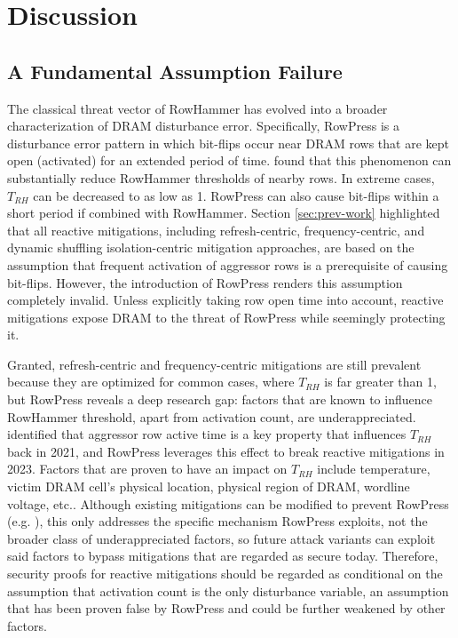 \documentclass[journal,twocolumn]{IEEEtran}
\begin{document}
\section{Discussion}\label{sec:eval}

\subsection{A Fundamental Assumption Failure}

The classical threat vector of RowHammer has evolved into a broader characterization of DRAM disturbance error. Specifically, RowPress\cite{Luo23} is a disturbance error pattern in which bit-flips occur near DRAM rows that are kept open (activated) for an extended period of time. \cite{Luo23} found that this phenomenon can substantially reduce RowHammer thresholds of nearby rows. In extreme cases, $T_{RH}$ can be decreased to as low as 1. RowPress can also cause bit-flips within a short period if combined with RowHammer\cite{Luo24_2}.  Section \ref{sec:prev-work} highlighted that all reactive mitigations, including refresh-centric, frequency-centric, and dynamic shuffling isolation-centric mitigation approaches, are based on the assumption that frequent activation of aggressor rows is a prerequisite of causing bit-flips. However, the introduction of RowPress renders this assumption completely invalid. Unless explicitly taking row open time into account, reactive mitigations expose DRAM to the threat of RowPress while seemingly protecting it. 

Granted, refresh-centric and frequency-centric mitigations are still prevalent because they are optimized for common cases, where $T_{RH}$ is far greater than 1, but RowPress reveals a deep research gap: factors that are known to influence RowHammer threshold, apart from activation count, are underappreciated.  \cite{Orosa21} identified that aggressor row active time is a key property that influences $T_{RH}$ back in 2021, and RowPress leverages this effect to break reactive mitigations in 2023. Factors that are proven to have an impact on $T_{RH}$ include temperature, victim DRAM cell's physical location, physical region of DRAM, wordline voltage, etc.\cite{Orosa21,Yaglikci22}. Although existing mitigations can be modified to prevent RowPress (e.g. \cite{Luo23,Luo24,Qureshi24_2}), this only addresses the specific mechanism RowPress exploits, not the broader class of underappreciated factors, so future attack variants can exploit said factors to bypass mitigations that are regarded as secure today. Therefore, security proofs for reactive mitigations should be regarded as conditional on the assumption that activation count is the only disturbance variable, an assumption that has been proven false by RowPress and could be further weakened by other factors.
\end{document}
